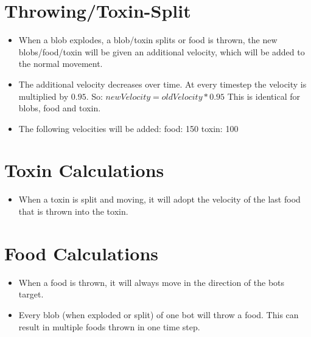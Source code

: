 \documentclass[10pt,a4paper]{article}
\begin{document}
\section{Throwing/Toxin-Split}
\begin{itemize}
\item When a blob explodes, a blob/toxin splits or food is thrown, the new blobs/food/toxin will be given an
      additional velocity, which will be added to the normal movement.
\item The additional velocity decreases over time. At every timestep the velocity is multiplied by $0.95$. \newline
      So: $newVelocity = oldVelocity * 0.95$ \newline
      This is identical for blobs, food and toxin.	
\item The following velocities will be added: \newline
      food:  150 \newline
      toxin: 100 \newline
      
\end{itemize}

\section{Toxin Calculations}
\begin{itemize}
\item When a toxin is split and moving, it will adopt the velocity of the last food that is thrown into the toxin.
\end{itemize}

\section{Food Calculations}
\begin{itemize}
\item When a food is thrown, it will always move in the direction of the bots target.
\item Every blob (when exploded or split) of one bot will throw a food. This can result in multiple foods thrown 
      in one time step.
\end{itemize}
\end{document}

